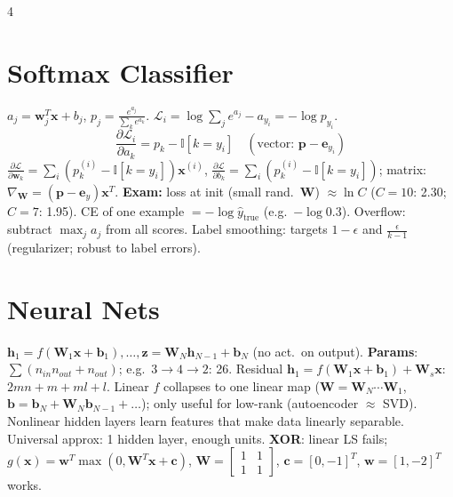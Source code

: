 \documentclass[8pt,landscape]{extarticle}
\newcommand{\x}{\mathbf{x}}
\newcommand{\z}{\mathbf{z}}
\newcommand{\h}{\mathbf{h}}
\newcommand{\bb}{\mathbf{b}}
\newcommand{\W}{\mathbf{W}}
\newcommand{\w}{\mathbf{w}}
\newcommand{\bI}{\mathbb{I}}
\newcommand{\pd}[2]{\frac{\partial #1}{\partial #2}}
\newcommand{\ex}{\textbf{\color{BrickRed}Exam:} }
\begin{document}
\begin{multicols*}{4}
\section{Softmax Classifier}
$a_j=\w_j^T\x+b_j$, $p_j=\frac{e^{a_j}}{\sum_k e^{a_k}}$. $\mathcal L_i=\log\sum_je^{a_j}-a_{y_i}=-\log p_{y_i}$.
\[\pd{\mathcal L_i}{a_k}=p_k-\bI[k{=}y_i]\quad(\text{vector: }\mathbf p-\mathbf e_{y_i})\]
$\pd{\mathcal L}{\w_k}=\sum_i(p_k^{(i)}-\bI[k{=}y_i])\x^{(i)}$, $\pd{\mathcal L}{b_k}=\sum_i(p^{(i)}_k-\bI[k{=}y_i])$; matrix: $\nabla_\W=(\mathbf p-\mathbf e_y)\x^T$. \ex loss at init (small rand.\ $\W$) $\approx\ln C$ ($C{=}10$: 2.30; $C{=}7$: 1.95). CE of one example $=-\log\hat y_{\text{true}}$ (e.g.\ $-\log0.3$).
Overflow: subtract $\max_j a_j$ from all scores. Label smoothing: targets $1-\epsilon$ and $\frac{\epsilon}{k-1}$ (regularizer; robust to label errors).

\section{Neural Nets}
$\h_1=f(\W_1\x+\bb_1),\dots,\z=\W_N\h_{N-1}+\bb_N$ (no act.\ on output). \textbf{Params}: $\sum(n_{in}n_{out}+n_{out})$; e.g.\ $3{\to}4{\to}2$: 26. Residual $\h_1=f(\W_1\x+\bb_1)+\W_s\x$: $2mn+m+ml+l$.
Linear $f$ collapses to one linear map ($\W=\W_N\cdots\W_1$, $\bb=\bb_N+\W_N\bb_{N-1}+\dots$); only useful for low-rank (autoencoder $\approx$ SVD). Nonlinear hidden layers learn features that make data linearly separable. Universal approx: 1 hidden layer, enough units.
\textbf{XOR}: linear LS fails; $g(\x)=\w^T\max(0,\W^T\x+\mathbf c)$, $\W=\begin{bmatrix}1&1\\1&1\end{bmatrix}$, $\mathbf c=[0,-1]^T$, $\w=[1,-2]^T$ works.


\end{multicols*}
\end{document}
